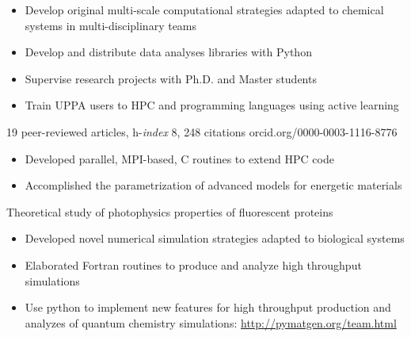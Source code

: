 \documentclass[10pt,a4paper,ragged2e]{../altacv}
\begin{document}
\begin{itemize}
\item Develop original multi-scale computational strategies adapted to chemical systems in multi-disciplinary teams
\item Develop and distribute data analyses libraries with Python
\item Supervise research projects with Ph.D. and Master students
\item Train UPPA users to HPC and programming languages using active learning
\end{itemize}
{\small 19 peer-reviewed articles, h-\textit{index} 8, 248 citations \hfill \hspace{-1ex}orcid.org/0000-0003-1116-8776}

\bigskip

\begin{itemize}
\item Developed parallel, MPI-based, C routines to extend HPC code
\item Accomplished the parametrization of advanced models for energetic materials
\end{itemize}

\bigskip

Theoretical study of photophysics properties of fluorescent proteins
\smallskip
\begin{itemize}
\item Developed novel numerical simulation strategies adapted to biological systems
\item Elaborated Fortran routines to produce and analyze high throughput simulations
\end{itemize}


\vspace{-2mm}
\begin{itemize}\setlength{\itemsep}{0ex}
    \item Use python to implement new features for high throughput production and analyzes of quantum chemistry simulations: \url{http://pymatgen.org/team.html}
\end{itemize}
\end{document}
